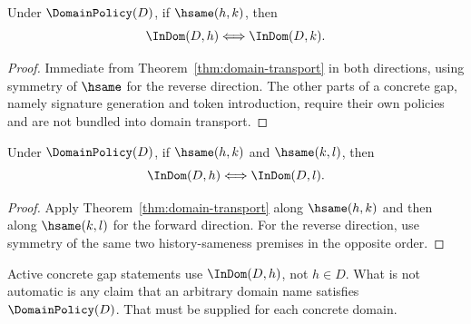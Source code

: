 \begin{corollary}
\label{cor:domain-invariance-of-concrete-source-admission}
Under $\DomainPolicy(D)$, if $\hsame(h,k)$, then
$$
  \InDom(D,h)\Longleftrightarrow\InDom(D,k).
$$
\end{corollary}

\begin{proof}
Immediate from Theorem~\ref{thm:domain-transport} in both directions, using symmetry of \(\hsame\) for the reverse direction. The other parts of a concrete gap, namely signature generation and token introduction, require their own policies and are not bundled into domain transport.
\end{proof}

\begin{corollary}
\label{cor:domain-three-way-transport-equivalence}
Under $\DomainPolicy(D)$, if $\hsame(h,k)$ and $\hsame(k,l)$, then
$$
  \InDom(D,h)\Longleftrightarrow\InDom(D,l).
$$
\end{corollary}

\begin{proof}
Apply Theorem~\ref{thm:domain-transport} along $\hsame(h,k)$ and then along $\hsame(k,l)$ for the forward direction. For the reverse direction, use symmetry of the same two history-sameness premises in the opposite order.
\end{proof}

\begin{remark}
Active concrete gap statements use \(\InDom(D,h)\), not \(h\in D\). What is not automatic is any claim that an arbitrary domain name satisfies \(\DomainPolicy(D)\). That must be supplied for each concrete domain.
\end{remark}

